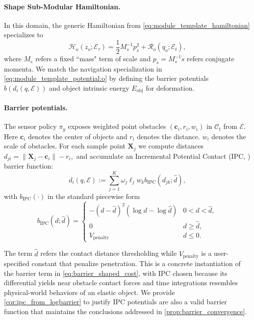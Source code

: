 \documentclass{article} %
\let\vec=\boldsymbol
\begin{document}
\paragraph{{Shape Sub-Modular Hamiltonian.}}

In this domain, the generic Hamiltonian from \cref{eq:module_template_hamiltonian} specializes to
\begin{equation}
\mathcal{H}_{\text{o}}(z_o;\mathcal{E}_\tau)
=\frac{1}{2}M_s^{-1} p_s^2 
+ \mathcal{R}_o(q_o;\mathcal{E}_t),
\end{equation}
where $M_s$ refers a fixed ``mass" term of scale and $p_s=M_s^{-1}\dot{s}$ refers conjugate momenta.
We match the navigation specialization in \cref{eq:module_template_potential:o} by defining the barrier potentials $b(d_i(q,\mathcal{E}))$ and object intrinsic energy $E_{\mathrm{obj}}$ for deformation.

\paragraph{{Barrier potentials.}}
The sensor policy $\pi_y$ exposes { weighted point obstacles} $(\mathbf{c}_i,r_i,w_i)$ in $\mathcal{C}_t$ from $\mathcal{E}$. Here $\vec{c}_i$ denotes the center of objects and $r_i$ denotes the distance. $w_i$ denotes the scale of obstacles. For each sample point $\mathbf{X}_j$ we compute distances \(d_{ji} = \|\mathbf{X}_j - \mathbf{c}_i\| - r_i,\)
and accumulate an Incremental Potential Contact (IPC, \citet{li2020incremental}) barrier function:
\begin{equation}
d_i(q,\mathcal{E}):=
\sum_{j=1}^K \omega_j \ell_j  w_k b_{\text{IPC}}(d_{jk};\hat{d}),
\end{equation}
with $b_{\text{IPC}}(\cdot)$ in the standard piecewise form
\begin{equation}
b_{\text{IPC}}(d;\hat{d}) =
\begin{cases}
-(d-\hat{d})^2(\log d - \log \hat{d}) & 0 < d < \hat{d},\\[2pt]
0 & d \geq \hat{d},\\[2pt]
V_{\text{penalty}} & d \leq 0.
\end{cases}
\end{equation}
 
The term $\hat{d}$ refers the contact distance thresholding while $V_{\text{penalty}}$ is a user-specified constant that penalize penetration. This is a concrete instantiation of the barrier term in \cref{eq:barrier_shaped_cost}, with IPC chosen because its differential yields near obstacle contact forces and time integrations resembles physical-world behaviors of an elastic object. { We provide \cref{cor:ipc_from_logbarrier} to justify IPC potentials are also a valid barrier function that maintains the conclusions addressed in \cref{prop:barrier_convergence}.}
\end{document}
